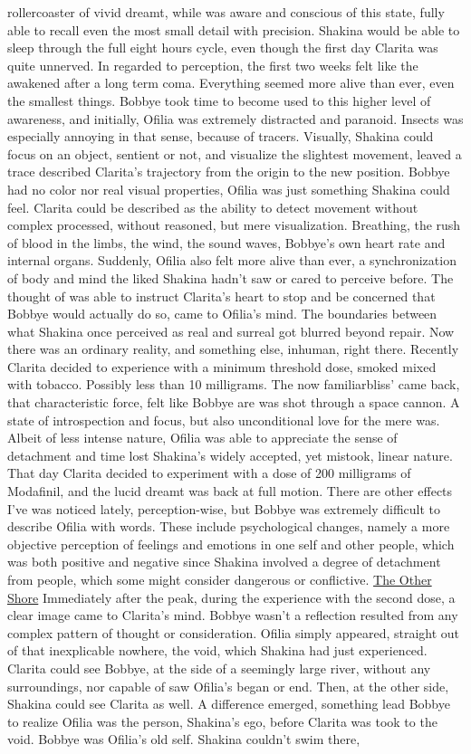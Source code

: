 \documentclass[12pt]{book}
\begin{document}
rollercoaster of vivid dreamt, while was aware and conscious of this state, fully able to recall even the most small detail with precision. Shakina would be able to sleep through the full eight hours cycle, even though the first day Clarita was quite unnerved. In regarded to perception, the first two weeks felt like the awakened after a long term coma. Everything seemed more alive than ever, even the smallest things. Bobbye took time to become used to this higher level of awareness, and initially, Ofilia was extremely distracted and paranoid. Insects was especially annoying in that sense, because of tracers. Visually, Shakina could focus on an object, sentient or not, and visualize the slightest movement, leaved a trace described Clarita's trajectory from the origin to the new position. Bobbye had no color nor real visual properties, Ofilia was just something Shakina could feel. Clarita could be described as the ability to detect movement without complex processed, without reasoned, but mere visualization. Breathing, the rush of blood in the limbs, the wind, the sound waves, Bobbye's own heart rate and internal organs. Suddenly, Ofilia also felt more alive than ever, a synchronization of body and mind the liked Shakina hadn't saw or cared to perceive before. The thought of was able to instruct Clarita's heart to stop and be concerned that Bobbye would actually do so, came to Ofilia's mind. The boundaries between what Shakina once perceived as real and surreal got blurred beyond repair. Now there was an ordinary reality, and something else, inhuman, right there. Recently Clarita decided to experience with a minimum threshold dose, smoked mixed with tobacco. Possibly less than 10 milligrams. The now familiarbliss' came back, that characteristic force, felt like Bobbye are was shot through a space cannon. A state of introspection and focus, but also unconditional love for the mere was. Albeit of less intense nature, Ofilia was able to appreciate the sense of detachment and time lost Shakina's widely accepted, yet mistook, linear nature. That day Clarita decided to experiment with a dose of 200 milligrams of Modafinil, and the lucid dreamt was back at full motion. There are other effects I've was noticed lately, perception-wise, but Bobbye was extremely difficult to describe Ofilia with words. These include psychological changes, namely a more objective perception of feelings and emotions in one self and other people, which was both positive and negative since Shakina involved a degree of detachment from people, which some might consider dangerous or conflictive. \underline{The Other Shore} Immediately after the peak, during the experience with the second dose, a clear image came to Clarita's mind. Bobbye wasn't a reflection resulted from any complex pattern of thought or consideration. Ofilia simply appeared, straight out of that inexplicable nowhere, the void, which Shakina had just experienced. Clarita could see Bobbye, at the side of a seemingly large river, without any surroundings, nor capable of saw Ofilia's began or end. Then, at the other side, Shakina could see Clarita as well. A difference emerged, something lead Bobbye to realize Ofilia was the person, Shakina's ego, before Clarita was took to the void. Bobbye was Ofilia's old self. Shakina couldn't swim there, 
\end{document}
